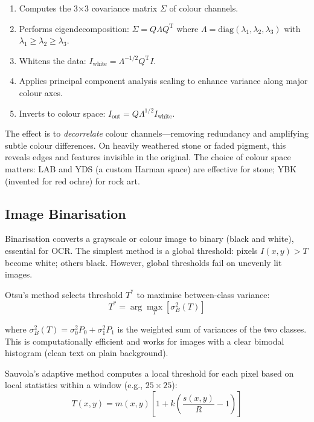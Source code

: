 \begin{enumerate}
	\item Computes the 3×3 covariance matrix $\Sigma$ of colour channels.
	\item Performs eigendecomposition: $\Sigma = Q \Lambda Q^{\text{T}}$ where $\Lambda = \text{diag}(\lambda_1, \lambda_2, \lambda_3)$ with $\lambda_1 \geq \lambda_2 \geq \lambda_3$.
	\item Whitens the data: $I_{\text{white}} = \Lambda^{-1/2} Q^{\text{T}} I$.
	\item Applies principal component analysis scaling to enhance variance along major colour axes.
	\item Inverts to colour space: $I_{\text{out}} = Q \Lambda^{1/2} I_{\text{white}}$.
\end{enumerate}

The effect is to \emph{decorrelate} colour channels—removing redundancy and amplifying subtle colour differences. On heavily weathered stone or faded pigment, this reveals edges and features invisible in the original. The choice of colour space matters: LAB and YDS (a custom Harman space) are effective for stone; YBK (invented for red ochre) for rock art.

\subsection{Image Binarisation}

Binarisation converts a grayscale or colour image to binary (black and white), essential for OCR. The simplest method is a global threshold: pixels $I(x,y) > T$ become white; others black. However, global thresholds fail on unevenly lit images.

Otsu's method selects threshold $T^*$ to maximise between-class variance:
\begin{equation}
T^* = \arg\max_T \left[ \sigma_B^2(T) \right]
\end{equation}

where $\sigma_B^2(T) = \sigma_0^2 P_0 + \sigma_1^2 P_1$ is the weighted sum of variances of the two classes. This is computationally efficient and works for images with a clear bimodal histogram (clean text on plain background).

Sauvola's adaptive method computes a local threshold for each pixel based on local statistics within a window (e.g., $25 \times 25$):
\begin{equation}
T(x,y) = m(x,y) \left[ 1 + k \left( \frac{s(x,y)}{R} - 1 \right) \right]
\end{equation}

